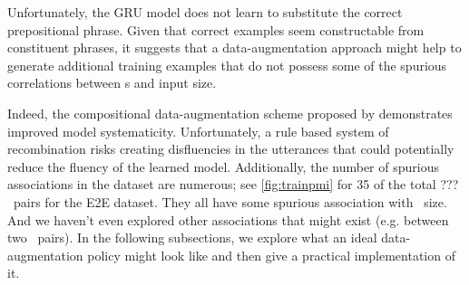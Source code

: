 Unfortunately, the GRU model does not learn to substitute the correct 
prepositional phrase. Given that correct examples seem constructable from
constituent phrases, it suggests that a data-augmentation approach
might help to generate additional training examples that do not possess 
some of the spurious correlations between \attributevalue s and input size.

Indeed, the compositional data-augmentation scheme proposed by \citet{andreas2020} demonstrates  improved model systematicity.
Unfortunately, a rule based system of recombination risks creating 
disfluencies in the utterances that could potentially reduce the fluency
of the learned model. Additionally, the number of spurious
associations in the dataset are numerous; see \autoref{fig:trainpmi} for 35 of the
total {\color{red}???} \attributevalue~pairs for the E2E dataset. They all have some 
spurious association with \meaningrepresentation~size. And we haven't even
explored other associations that might exist (e.g. between two \attributevalue~pairs). In the following subsections, we explore what an ideal
 data-augmentation policy might look like and then give a practical 
implementation of it.






